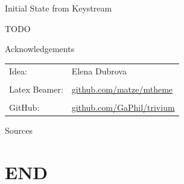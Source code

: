 \documentclass[10pt, compress]{beamer}
\begin{document}
\begin{frame}{Initial State from Keystream}

TODO

\end{frame}

\begin{frame}{Acknowledgements}
\begin{table}
\centering
\begin{tabular}{l l}
Idea: & Elena Dubrova\\
& \\
Latex Beamer: & \url{github.com/matze/mtheme}\\
& \\
GitHub: & \url{github.com/GaPhil/trivium}
\end{tabular}
\end{table}
\end{frame}

\begin{frame}{Sources}

\nocite{*}
\end{frame}


\section{END}
\end{document}
